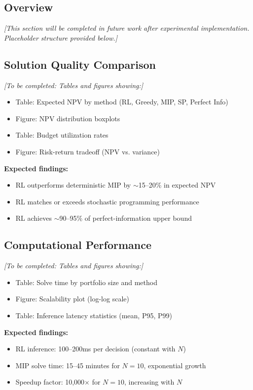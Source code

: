 \subsection{Overview}

\textit{[This section will be completed in future work after experimental implementation. Placeholder structure provided below.]}

\subsection{Solution Quality Comparison}

\textit{[To be completed: Tables and figures showing:]}

\begin{itemize}
    \item Table: Expected NPV by method (RL, Greedy, MIP, SP, Perfect Info)
    \item Figure: NPV distribution boxplots
    \item Table: Budget utilization rates
    \item Figure: Risk-return tradeoff (NPV vs. variance)
\end{itemize}

\textbf{Expected findings:}
\begin{itemize}
    \item RL outperforms deterministic MIP by $\sim$15--20\% in expected NPV
    \item RL matches or exceeds stochastic programming performance
    \item RL achieves $\sim$90--95\% of perfect-information upper bound
\end{itemize}

\subsection{Computational Performance}

\textit{[To be completed: Tables and figures showing:]}

\begin{itemize}
    \item Table: Solve time by portfolio size and method
    \item Figure: Scalability plot (log-log scale)
    \item Table: Inference latency statistics (mean, P95, P99)
\end{itemize}

\textbf{Expected findings:}
\begin{itemize}
    \item RL inference: 100--200ms per decision (constant with $N$)
    \item MIP solve time: 15--45 minutes for $N=10$, exponential growth
    \item Speedup factor: 10,000$\times$ for $N=10$, increasing with $N$
\end{itemize}

